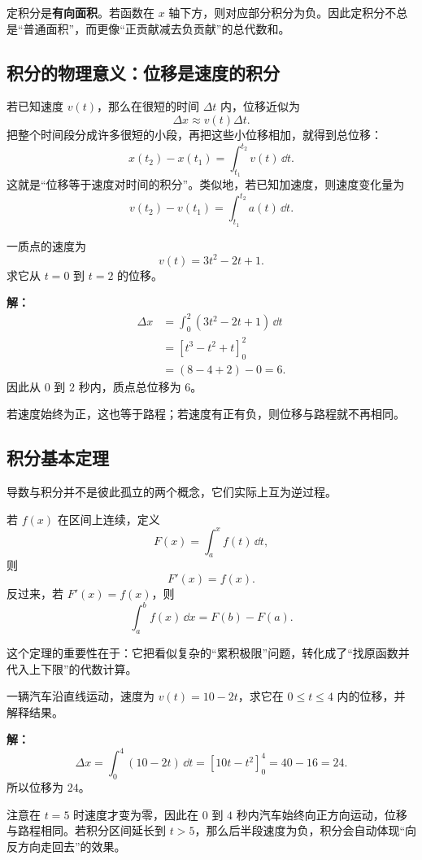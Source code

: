 \begin{remark}
定积分是\textbf{有向面积}。若函数在 $x$ 轴下方，则对应部分积分为负。因此定积分不总是“普通面积”，而更像“正贡献减去负贡献”的总代数和。
\end{remark}

\subsection{积分的物理意义：位移是速度的积分}

若已知速度 $v(t)$，那么在很短的时间 $\Delta t$ 内，位移近似为
\[
  \Delta x \approx v(t)\Delta t.
\]
把整个时间段分成许多很短的小段，再把这些小位移相加，就得到总位移：
\[
  x(t_2)-x(t_1) = \int_{t_1}^{t_2} v(t)\,\dd t.
\]
这就是“位移等于速度对时间的积分”。类似地，若已知加速度，则速度变化量为
\[
  v(t_2)-v(t_1)=\int_{t_1}^{t_2} a(t)\,\dd t.
\]

\begin{example}
一质点的速度为
\[
  v(t)=3t^2-2t+1.
\]
求它从 $t=0$ 到 $t=2$ 的位移。

\textbf{解：}
\begin{align*}
  \Delta x
  &= \int_0^2 (3t^2-2t+1)\,\dd t \\
  &= \left[t^3 - t^2 + t\right]_0^2 \\
  &= (8-4+2)-0 = 6.
\end{align*}
因此从 $0$ 到 $2$ 秒内，质点总位移为 $6$。

若速度始终为正，这也等于路程；若速度有正有负，则位移与路程就不再相同。
\end{example}

\subsection{积分基本定理}

导数与积分并不是彼此孤立的两个概念，它们实际上互为逆过程。

\begin{theorem}[积分基本定理]
若 $f(x)$ 在区间上连续，定义
\[
  F(x)=\int_a^x f(t)\,\dd t,
\]
则
\[
  F'(x)=f(x).
\]
反过来，若 $F'(x)=f(x)$，则
\[
  \int_a^b f(x)\,\dd x = F(b)-F(a).
\]
\end{theorem}

这个定理的重要性在于：它把看似复杂的“累积极限”问题，转化成了“找原函数并代入上下限”的代数计算。

\begin{example}
一辆汽车沿直线运动，速度为 $v(t)=10-2t$，求它在 $0\le t\le 4$ 内的位移，并解释结果。

\textbf{解：}
\[
  \Delta x = \int_0^4 (10-2t)\,\dd t = \left[10t-t^2\right]_0^4 = 40-16 = 24.
\]
所以位移为 $24$。

注意在 $t=5$ 时速度才变为零，因此在 $0$ 到 $4$ 秒内汽车始终向正方向运动，位移与路程相同。若积分区间延长到 $t>5$，那么后半段速度为负，积分会自动体现“向反方向走回去”的效果。
\end{example}

